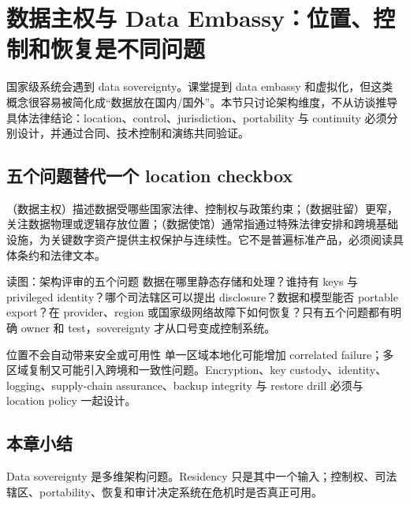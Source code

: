 \section{数据主权与 Data Embassy：位置、控制和恢复是不同问题}

国家级系统会遇到 data sovereignty。课堂提到 data embassy 和虚拟化，但这类概念很容易被简化成“数据放在国内/国外”。本节只讨论架构维度，不从访谈推导具体法律结论：location、control、jurisdiction、portability 与 continuity 必须分别设计，并通过合同、技术控制和演练共同验证。

\subsection{五个问题替代一个 location checkbox}

（数据主权）描述数据受哪些国家法律、控制权与政策约束；（数据驻留）更窄，关注数据物理或逻辑存放位置；（数据使馆）通常指通过特殊法律安排和跨境基础设施，为关键数字资产提供主权保护与连续性。它不是普遍标准产品，必须阅读具体条约和法律文本。


\begin{knowledgebox}{读图：架构评审的五个问题}
数据在哪里静态存储和处理？谁持有 keys 与 privileged identity？哪个司法辖区可以提出 disclosure？数据和模型能否 portable export？在 provider、region 或国家级网络故障下如何恢复？只有五个问题都有明确 owner 和 test，sovereignty 才从口号变成控制系统。
\end{knowledgebox}

\begin{warningbox}{位置不会自动带来安全或可用性}
单一区域本地化可能增加 correlated failure；多区域复制又可能引入跨境和一致性问题。Encryption、key custody、identity、logging、supply-chain assurance、backup integrity 与 restore drill 必须与 location policy 一起设计。
\end{warningbox}


\subsection{本章小结}

Data sovereignty 是多维架构问题。Residency 只是其中一个输入；控制权、司法辖区、portability、恢复和审计决定系统在危机时是否真正可用。

